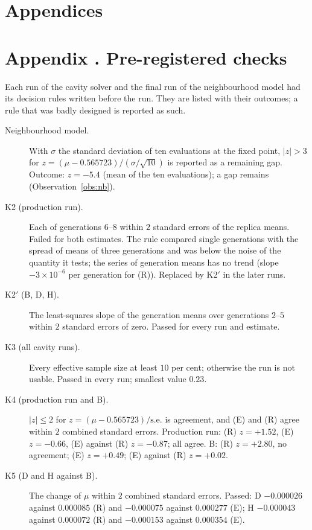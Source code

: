 \documentclass[11pt]{article}
\theoremstyle{plain}
\theoremstyle{definition}
\theoremstyle{remark}
\begin{document}
\clearpage
\appendix
\section*{Appendices}
\section*{Appendix \thesection. Pre-registered checks}\label{app:checks}

Each run of the cavity solver and the final run of the neighbourhood model had its decision rules written before the run. They are listed with their outcomes; a rule that was badly designed is reported as such.

\begin{description}
\item[Neighbourhood model.] With $\sigma$ the standard deviation of ten evaluations at the fixed point, $|z|>3$ for $z=(\mu-0.565723)/(\sigma/\sqrt{10})$ is reported as a remaining gap. Outcome: $z=-5.4$ (mean of the ten evaluations); a gap remains (Observation~\ref{obs:nb}).
\item[K2 (production run).] Each of generations $6$--$8$ within $2$ standard errors of the replica means. Failed for both estimates. The rule compared single generations with the spread of means of three generations and was below the noise of the quantity it tests; the series of generation means has no trend (slope $-3\times10^{-6}$ per generation for (R)). Replaced by K2$'$ in the later runs.
\item[K2$'$ (B, D, H).] The least-squares slope of the generation means over generations $2$--$5$ within $2$ standard errors of zero. Passed for every run and estimate.
\item[K3 (all cavity runs).] Every effective sample size at least $10$ per cent; otherwise the run is not usable. Passed in every run; smallest value $0.23$.
\item[K4 (production run and B).] $|z|\le2$ for $z=(\mu-0.565723)/\text{s.e.}$ is agreement, and (E) and (R) agree within $2$ combined standard errors. Production run: (R) $z=+1.52$, (E) $z=-0.66$, (E) against (R) $z=-0.87$; all agree. B: (R) $z=+2.80$, no agreement; (E) $z=+0.49$; (E) against (R) $z=+0.02$.
\item[K5 (D and H against B).] The change of $\mu$ within $2$ combined standard errors. Passed: D $-0.000026$ against $0.000085$ (R) and $-0.000075$ against $0.000277$ (E); H $-0.000043$ against $0.000072$ (R) and $-0.000153$ against $0.000354$ (E).

\end{description}
\end{document}
